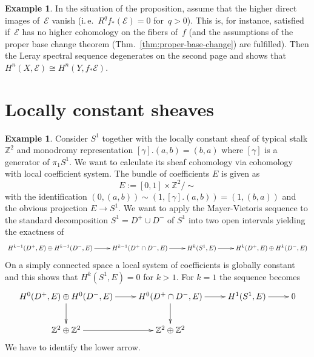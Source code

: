\documentclass[10pt]{amsart}
\makeatletter
\theoremstyle{definition}
\newtheorem{ex}[defn]{Example}
\theoremstyle{plain}
\theoremstyle{remark}
\newcommand{\E}{\mathcal{E}}
\newcommand{\ZZ}{\mathbb{Z}}
\newcommand{\union}{\cup}
\newcommand{\intersection}{\cap}
\newcommand{\ie}{i.\,e.\@\xspace}
\makeatother
\begin{document}
\begin{ex}In the situation of the proposition, assume that the higher direct
images of~$\E$ vanish (\ie~$R^q f_*(\E) = 0$ for~$q > 0$). This is, for
instance, satisfied if~$\E$ has no higher cohomology on the fibers of~$f$ (and
the assumptions of the proper base change theorem
(Thm.~\ref{thm:proper-base-change}) are fulfilled). Then the Leray spectral
sequence degenerates on the second page and shows that~$H^n(X,\E) \cong
H^n(Y,f_*\E)$.
\end{ex}


\section*{Locally constant sheaves}

\begin{ex}\label{twistarsch}
Consider $S^1$ together with the locally constant sheaf of typical stalk $\ZZ^2$ and monodromy representation $[\gamma].(a,b)=(b,a)$ where $[\gamma]$ is a generator of $\pi_1S^1$. We want to calculate its sheaf cohomology via cohomology with local coefficient system. The bundle of coefficients $E$ is given as $$E:=[0,1]\times\ZZ^2/\sim$$ with the identification $(0,(a,b))\sim (1,[\gamma].(a,b))=(1,(b,a))$ and the obvious projection $E\to S^1$. We want to apply the Mayer-Vietoris sequence to the standard decomposition $S^1=D^+\union D^-$ of $S^1$ into two open intervals yielding the exactness of
\[\begin{xy}
  \xymatrix{
  H^{k-1}(D^+,E)\oplus H^{k-1}(D^-,E)\ar[r] & H^{k-1}(D^+\intersection D^-,E)\ar[r] & H^k(S^1,E)\ar[r] & H^k(D^+,E)\oplus H^k(D^-,E)
  } 
  \end{xy}\]
On a simply connected space a local system of coefficients is globally constant and this shows that $H^k(S^1,E)=0$ for $k>1$. For $k=1$ the sequence becomes
\begin{align}\label{arsch}
\begin{xy}
  \xymatrix{
  H^0(D^+,E)\oplus H^0(D^-,E)\ar[r]\ar[d] & H^0(D^+\intersection D^-,E)\ar[r]\ar[d] & H^1(S^1,E)\ar[r] & 0\\
  \ZZ^2\oplus\ZZ^2\ar[r] & \ZZ^2\oplus\ZZ^2 & &
  }
  \end{xy}
\end{align}
We have to identify the lower arrow.\newline
{}
\end{ex}
\end{document}
